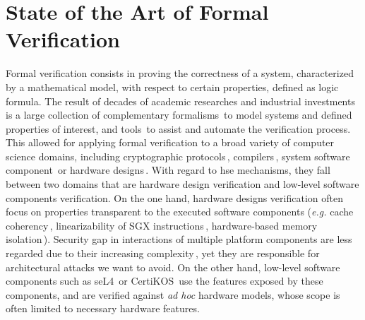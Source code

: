 \documentclass[oneside,a4paper]{memoir}
\begin{document}
\chapter{State of the Art of Formal Verification}

Formal verification consists in proving the correctness of a system,
characterized by a mathematical model, with respect to certain properties,
defined as logic formula.
%
The result of decades of academic researches and industrial investments is a
large collection of complementary
formalisms\,\cite{berthomieu1991petri,mcmillan1989compositional,baeten2005processalgebra,emmi2008interfaceautomata,hoare1969hoare,reynolds2002separation}
to model systems and defined properties of interest, and
tools\,\cite{cuoq2012framac,coq,cimatti2002nusmv,jackson2012alloy} to assist and
automate the verification process.
%
This allowed for applying formal verification to a broad variety of computer
science domains, including cryptographic
protocols\,\cite{goubault2000crypto,meadows2003crypto},
compilers\,\cite{leroy2012compcert}, system software
component\,\cite{klein2009sel4,gu2016certikos} or hardware
designs\,\cite{lie2003xom,kaivola2009formalintel,reid2016armv8}.
%
With regard to \ac{hse} mechanisms, they fall between two domains that are
hardware design verification and low-level software components verification.
%
On the one hand, hardware designs verification often focus on properties
transparent to the executed software components (\emph{e.g.} cache
coherency\,\cite{stern1995cachecoherence}, linearizability of SGX
instructions\,\cite{leslie2015sgx}, hardware-based memory
isolation\,\cite{lie2003xom}).
%
Security gap in interactions of multiple platform components are less regarded
due to their increasing complexity\,\cite{potlapally2011hardwaresecurity}, yet
they are responsible for architectural attacks we want to avoid.
%
On the other hand, low-level software components such as
seL4\,\cite{klein2009sel4} or CertiKOS\,\cite{gu2016certikos} use the features
exposed by these components, and are verified against \emph{ad hoc} hardware
models, whose scope is often limited to necessary hardware features.
%

%

\end{document}
